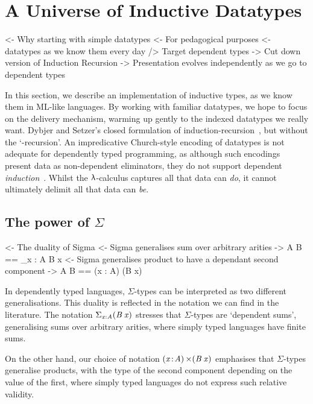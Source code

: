 \section{A Universe of Inductive Datatypes}
\label{sec:universe-desc}

\begin{wstructure}
<- Why starting with simple datatypes
    <- For pedagogical purposes
        <- datatypes as we know them every day
        /> Target dependent types
    -> Cut down version of Induction Recursion
        -> Presentation evolves independently as we go to dependent types
\end{wstructure}

In this section, we describe an implementation of inductive types, as
we know them in ML-like languages. By working with familiar datatypes,
we hope to focus on the delivery mechanism, warming up gently to the
indexed datatypes we really want.  %
Dybjer and Setzer's closed formulation of
induction-recursion~\cite{dybjer:axiom-ir}, but without the
`-recursion'.  An impredicative Church-style encoding of datatypes is
not adequate for dependently typed programming, as although such
encodings present data as non-dependent eliminators, they do not
support dependent \emph{induction}~\cite{geuvers:induction-not-derivable}.
Whilst the \(\LAMBINDER\)-calculus captures all that data can \emph{do},
it cannot ultimately delimit all that data can \emph{be}.

\subsection{The power of $\Sigma$}

\begin{wstructure}
<- The duality of Sigma
    <- Sigma generalises sum over arbitrary arities
        -> \Sigma A B == \Sigma_{x : A} B x
    <- Sigma generalises product to have a dependant second component
        -> \Sigma A B == (x : A) \times (B x)
\end{wstructure}

In dependently typed languages, $\Sigma$-types can be interpreted as
two different generalisations. This duality is reflected in the
notation we can find in the literature. The notation
$\blue{\Sigma}_{\x : \M{A}} (\M{B}\: \x)$ stresses that
$\Sigma$-types are `dependent sums', generalising sums over
arbitrary arities, where simply typed languages have finite sums.

On the other hand, our choice of notation $\SIGMA{\x}{\M{A}}
(\M{B}\:\x)$ emphasises that $\Sigma$-types generalise products,
with the type of the second component depending on the value of the
first, where simply typed languages do not express such relative validity.

